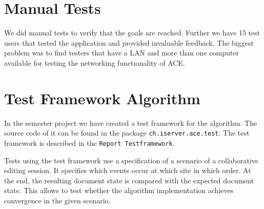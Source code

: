 \section{Manual Tests}
We did manual tests to verify that the goals are reached. Further we have
15 test users that tested the application and provided invaluable
feedback. The biggest problem was to find testers that have a LAN and
more than one computer available for testing the networking functionality
of ACE.



\section{Test Framework Algorithm}
In the semester project we have created a test framework for the algorithm.
The source code of it can be found in the package
\texttt{ch.iserver.ace.test}. The test framework is described in the
\texttt{Report Testframework}.

Tests using the test framework use a specification of a scenario
of a collaborative editing session. It specifies which events occur at
which site in which order. At the end, the resulting document state is
compared with the expected document state. This allows to test whether
the algorithm implementation achieves convergence in the given scenario.

